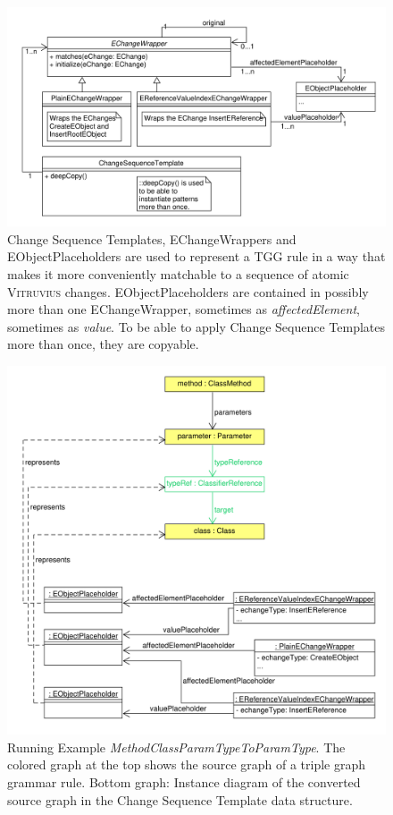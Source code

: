 \begin{figure}
\centering
\includegraphics[width=15cm]{figures/ChangeSeqTemplateWrappersPlaceholder.pdf}
\caption[Change Sequence Templates, EChangeWrappers and EObjectPlaceholders]{Change Sequence Templates, EChangeWrappers and EObjectPlaceholders are used to represent a TGG rule in a way that makes it more conveniently matchable to a sequence of atomic \textsc{Vitruvius} changes. EObjectPlaceholders are contained in possibly more than one EChangeWrapper, sometimes as \emph{affectedElement}, sometimes as \emph{value}.
To be able to apply Change Sequence Templates more than once, they are copyable.}
\label{fig:ChangeSeqTemplateWrappersPlaceholder}
\end{figure}

\begin{figure}
\centering
\includegraphics[width=15.5cm]{figures/tggRule_methodClassParamType_Templated.pdf}
\caption[Running Example \emph{MethodClassParamTypeToParamType} with template representation]{Running Example \emph{MethodClassParamTypeToParamType}. The colored graph at the top shows the source graph of a triple graph grammar rule. Bottom graph: Instance diagram of the converted source graph in the Change Sequence Template data structure.}
\label{fig:tggRule_methodClassParamType_Templated}
\end{figure}

